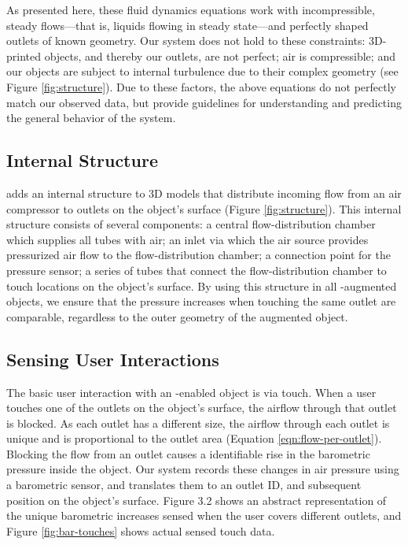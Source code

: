 				As presented here, these fluid dynamics equations work with
				incompressible, steady flows---that is, liquids flowing in steady
				state---and perfectly shaped outlets of known geometry. Our system does
				not hold to these constraints: 3D-printed objects, and thereby our
				outlets, are not perfect; air is compressible; and our objects are subject
				to internal turbulence due to their complex geometry (see
				Figure \ref{fig:structure}). Due to these factors, the above equations do not
				perfectly match our observed data, but provide guidelines for
				understanding and predicting the general behavior of the system.

			\subsection{Internal Structure}
				\at adds an internal structure to 3D models that distribute incoming flow
				from an air compressor to outlets on the object's surface
				(Figure \ref{fig:structure}). This internal structure consists of several
				components: a central flow-distribution chamber which supplies all tubes
				with air; an inlet via which the air source provides pressurized air flow
				to the flow-distribution chamber; a connection point for the pressure
				sensor; a series of tubes that connect the flow-distribution chamber to
				touch locations on the object's surface. By using this structure in all
				\at-augmented objects, we ensure that the pressure increases when touching
				the same outlet are comparable, regardless to the outer geometry of the
				augmented object.

			\subsection{Sensing User Interactions}
				The basic user interaction with an \at-enabled object is via touch. When a
				user touches one of the outlets on the object's surface, the airflow
				through that outlet is blocked. As each outlet has a different size, the
				airflow through each outlet is unique and is proportional to the outlet
				area (Equation \ref{eqn:flow-per-outlet}). Blocking the flow from an outlet causes
				a identifiable rise in the barometric pressure inside the object. Our
				system records these changes in air pressure using a barometric sensor,
				and translates them to an outlet ID, and subsequent position on the
				object's surface. Figure 3.2 shows an abstract representation of the
				unique barometric increases sensed when the user covers different
				outlets, and Figure \ref{fig:bar-touches} shows actual sensed touch
				data.

